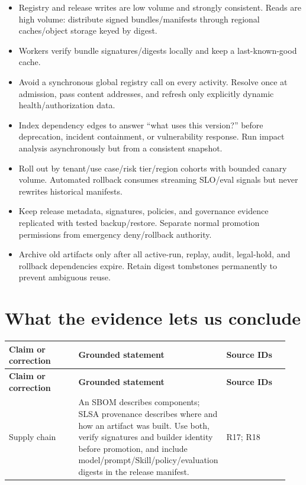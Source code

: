 \begin{itemize}

\item Registry and release writes are low volume and strongly consistent. Reads are high volume: distribute signed bundles/manifests through regional caches/object storage keyed by digest.

\item Workers verify bundle signatures/digests locally and keep a last-known-good cache.

\item Avoid a synchronous global registry call on every activity. Resolve once at admission, pass content addresses, and refresh only explicitly dynamic health/authorization data.

\item Index dependency edges to answer “what uses this version?” before deprecation, incident containment, or vulnerability response. Run impact analysis asynchronously but from a consistent snapshot.

\item Roll out by tenant/use case/risk tier/region cohorts with bounded canary volume. Automated rollback consumes streaming SLO/eval signals but never rewrites historical manifests.

\item Keep release metadata, signatures, policies, and governance evidence replicated with tested backup/restore. Separate normal promotion permissions from emergency deny/rollback authority.

\item Archive old artifacts only after all active-run, replay, audit, legal-hold, and rollback dependencies expire. Retain digest tombstones permanently to prevent ambiguous reuse.

\end{itemize}

\section{What the evidence lets us conclude}

\BookTableStart
\small
\begin{longtable}{@{}Y{0.3133\linewidth}Y{0.3133\linewidth}Y{0.3133\linewidth}@{}}
\color{white}\bfseries \textbf{Claim or correction} & \color{white}\bfseries \textbf{Grounded statement} & \color{white}\bfseries \textbf{Source IDs} \\
\endfirsthead
{}
\color{white}\bfseries \textbf{Claim or correction} & \color{white}\bfseries \textbf{Grounded statement} & \color{white}\bfseries \textbf{Source IDs} \\
\endhead
Supply chain & An SBOM describes components; SLSA provenance describes where and how an artifact was built. Use both, verify signatures and builder identity before promotion, and include model/prompt/Skill/policy/evaluation digests in the release manifest. & R17; R18 \\
\end{longtable}
\BookTableEnd

